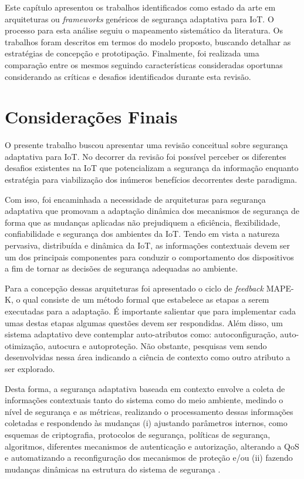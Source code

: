 \documentclass[tid,table]{texufpel} %
\begin{document}
Este capítulo apresentou os trabalhos identificados como estado da arte em arquiteturas ou \textit{frameworks} genéricos de segurança adaptativa para IoT. O processo para esta análise seguiu o mapeamento sistemático da literatura. Os trabalhos foram descritos em termos do modelo proposto, buscando detalhar as estratégias de concepção e prototipação. Finalmente, foi realizada uma comparação entre os mesmos seguindo características consideradas oportunas considerando as críticas e desafios identificados durante esta revisão. 


\chapter{Considerações Finais}

O presente trabalho buscou apresentar uma revisão conceitual sobre segurança adaptativa para IoT. No decorrer da revisão foi possível perceber os diferentes desafios existentes na IoT que potencializam a segurança da informação enquanto estratégia para viabilização dos inúmeros benefícios decorrentes deste paradigma. 

Com isso, foi encaminhada a necessidade de arquiteturas para segurança adaptativa que promovam a adaptação dinâmica dos mecanismos de segurança de forma que as mudanças aplicadas não prejudiquem a eficiência, flexibilidade, confiabilidade e segurança dos ambientes da IoT. Tendo em vista a natureza pervasiva, distribuída e dinâmica da IoT, as informações contextuais devem ser um dos principais componentes para conduzir o comportamento dos dispositivos a fim de tornar as decisões de segurança adequadas ao ambiente. 

Para a concepção dessas arquiteturas foi apresentado o ciclo de \textit{feedback} MAPE-K, o qual consiste de um método formal que estabelece as etapas a serem executadas para a adaptação. É importante salientar que para implementar cada umas destas etapas algumas questões devem ser respondidas. Além disso, um sistema adaptativo deve contemplar auto-atributos como: autoconfiguração, auto-otimização, autocura e autoproteção. Não obstante, pesquisas vem sendo desenvolvidas nessa área indicando a ciência de contexto como outro atributo a ser explorado.

Desta forma, a segurança adaptativa baseada em contexto envolve a coleta de informações contextuais tanto do sistema como do meio ambiente, medindo o nível de segurança e as métricas, realizando o processamento dessas informações coletadas e respondendo às mudanças (i) ajustando parâmetros internos, como esquemas de criptografia, protocolos de segurança, políticas de segurança, algoritmos, diferentes mecanismos de autenticação e autorização, alterando a QoS e automatizando a reconfiguração dos mecanismos de proteção e/ou (ii) fazendo mudanças dinâmicas na estrutura do sistema de segurança \cite{habtamu12}.
\end{document}
